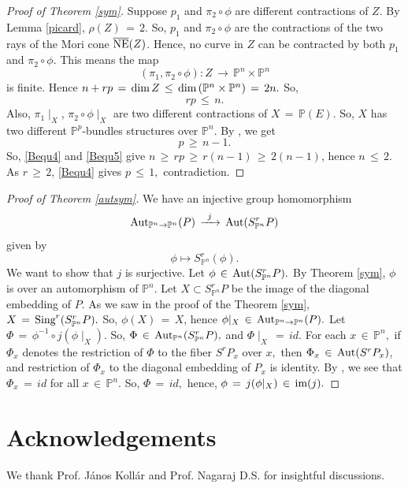 \documentclass[12pt,reqno]{amsart}
\theoremstyle{definition}
\numberwithin{equation}{section}
\begin{document}
\begin{proof}[Proof of Theorem \ref{sym}]
 Suppose $p_1$ and $\pi_2\circ \phi$ are different contractions of $Z$. By Lemma \ref{picard}, $ \rho(Z)\,=\,2.$ So, $p_1$ and $\pi_2\circ \phi$ are the contractions of the two rays of the Mori cone $\overline{\textnormal{NE}}(Z)$. Hence, no curve in $Z$ can be contracted by both $p_1$ and $\pi_2\circ \phi$. This means the map $$ (\pi_1, \pi_2\circ \phi): Z \,\longrightarrow\, \mathbb{P}^n \times \mathbb{P}^n$$
is finite. Hence $ n+rp\,=\, \textnormal{dim}\, Z\, \leq\, \textnormal{dim}\,(\mathbb{P}^n \times \mathbb{P}^n)\,=\, 2n.$ So, 
  \begin{equation}\label{Bequ4}
   rp\, \leq\, n. 
  \end{equation}
  Also, $ \pi_{1}{\mid_{X}}$, $ \pi_{2} \circ \phi{\mid_{X}}$ are two different contractions of $ X\,=\, \mathbb{P}(E).$ So, $X$ has two different $\mathbb{P}^p$-bundles structures over $\mathbb{P}^n$. By \cite{Sa}, we get 
  \begin{equation}\label{Bequ5}
  p\,\geq\, n-1.
  \end{equation}
  So, \eqref{Bequ4} and \eqref{Bequ5}
 give $  n\, \geq\, rp\, \geq\, r(n-1) \,\geq\, 2(n-1)$, hence $ n\,\leq\, 2$. As $ r\, \geq\, 2$, \eqref{Bequ4} gives $ p\,\leq\, 1,$ contradiction.
\end{proof}
\begin{proof}[Proof of Theorem \ref{autsym}]        
    We have an injective group homomorphism 
    $$ \textnormal{Aut}_{\mathbb{P}^n \rightarrow \mathbb{P}^n}(P) \,\xrightarrow{\,\,\,j\,\,\,}\, \textnormal{Aut}(S^{r}_{\mathbb{P}^n}P) $$ given by $$ \phi \longmapsto S_{\mathbb{P}^n}^{r}(\phi).$$ 
We want to show that $j$ is surjective. Let $ \phi \,\in\, \textnormal{Aut}(S_{\mathbb{P}^n}^{r}P).$ By Theorem \ref{sym}, $ \phi$ is over an automorphism of $ \mathbb{P}^n.$ Let $ X \subset S^{r}_{\mathbb{P}^n}P$ be the image of the diagonal embedding of $P$. As we saw in the proof of the Theorem \ref{sym}, $ X\,=\, \textnormal{Sing}^r ( S_{\mathbb{P}^n}^rP).$ So, $ \phi(X)\,=\,X$, hence $ \phi{\mid_{X}}\,\in\, \textnormal{Aut}_{\mathbb{P}^n\rightarrow \mathbb{P}^n}(P).$
Let $ \Phi \,=\,  \phi^{-1}\circ j (\phi{\mid_{X}})$. So, $ \Phi \,\in\, \textnormal{Aut}_{\mathbb{P}^n}(S_{\mathbb{P}^n}^{r}P),$ and $ \Phi{\mid_{X}}\,=\, id.$ For each $ x\,\in\, \mathbb{P}^n,$ if $ \Phi_{x}$ denotes the restriction of $ \Phi$ to the fiber $ S^{r}P_{x}$ over $x,$ then $ \Phi_{x}\,\in\, \textnormal{Aut}(S^{r}P_{x})$, and restriction of $ \Phi_{x}$ to the diagonal embedding of $P_{x}$ is identity. By  {\cite[Theorem 3.1.1]{Sh}}, we see that $ \Phi_{x}\,=\, id $ for all $x\,\in\, \mathbb{P}^n.$ So, $ \Phi \,=\, id,$ hence, $ \phi\,=\, j(\phi{\mid_{X}})\,\in\, \textnormal{im}(j).$ 
\end{proof}
\section{Acknowledgements}\vskip 0.5mm We thank Prof. János Kollár and Prof. Nagaraj D.S. for insightful discussions.
\printbibliography
\end{document}
